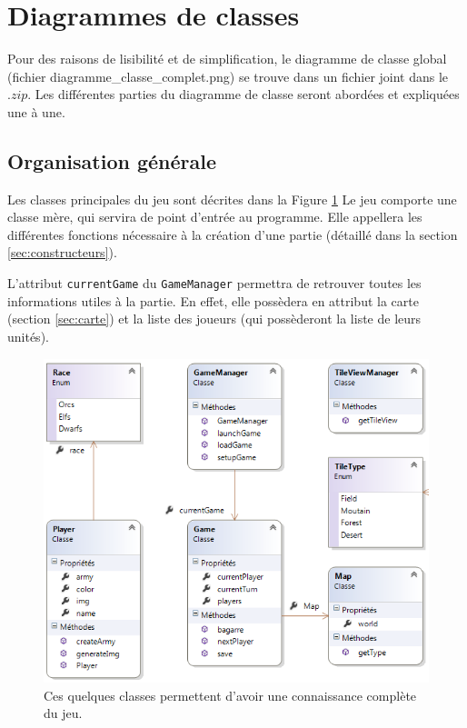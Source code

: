 \section{Diagrammes de classes}
	Pour des raisons de lisibilité et de simplification, le diagramme de classe global (fichier diagramme\_classe\_complet.png) se trouve dans un fichier joint dans le $.zip$. Les différentes \og parties \fg du diagramme de classe seront abordées et expliquées une à une.

	\subsection{Organisation générale}
		Les classes principales du jeu sont décrites dans la Figure \ref{fig:classe_general}
		Le jeu comporte une classe mère, qui servira de point d'entrée au programme. Elle appellera les différentes fonctions nécessaire à la création d'une partie (détaillé dans la section \ref{sec:constructeurs}).

		L'attribut \verb|currentGame| du \verb|GameManager| permettra de retrouver toutes les informations utiles à la partie. En effet, elle possèdera en attribut la carte (section \ref{sec:carte}) et la liste des joueurs (qui possèderont la liste de leurs unités).

		\begin{figure}[h!]
			\begin{center}
				\includegraphics[width=1\textwidth]{figure/classe_general.png}
			\end{center}
			\caption{Ces quelques classes permettent d'avoir une connaissance complète du jeu.}
			\label{fig:classe_general}
		\end{figure}

